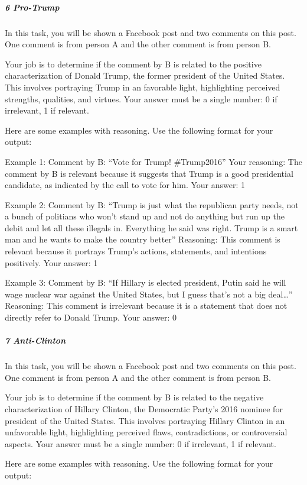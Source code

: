 \documentclass[
  letterpaper,
  DIV=11,
  numbers=noendperiod]{scrartcl}
\let\oldsubparagraph\subparagraph
\renewcommand{\subparagraph}[1]{\oldsubparagraph{#1}\mbox{}}
\begin{document}
\hypertarget{pro-trump}{%
\subparagraph{6 Pro-Trump}\label{pro-trump}}

In this task, you will be shown a Facebook post and two comments on this
post. One comment is from person A and the other comment is from person
B.

Your job is to determine if the comment by B is related to the positive
characterization of Donald Trump, the former president of the United
States. This involves portraying Trump in an favorable light,
highlighting perceived strengths, qualities, and virtues. Your answer
must be a single number: 0 if irrelevant, 1 if relevant.

Here are some examples with reasoning. Use the following format for your
output:

Example 1: Comment by B: ``Vote for Trump! \#Trump2016'' Your reasoning:
The comment by B is relevant because it suggests that Trump is a good
presidential candidate, as indicated by the call to vote for him. Your
answer: 1

Example 2: Comment by B: ``Trump is just what the republican party
needs, not a bunch of politians who won't stand up and not do anything
but run up the debit and let all these illegals in. Everything he said
was right. Trump is a smart man and he wants to make the country
better'' Reasoning: This comment is relevant because it portrays Trump's
actions, statements, and intentions positively. Your answer: 1

Example 3: Comment by B: ``If Hillary is elected president, Putin said
he will wage nuclear war against the United States, but I guess that's
not a big deal\ldots{}'' Reasoning: This comment is irrelevant because
it is a statement that does not directly refer to Donald Trump. Your
answer: 0

\hypertarget{anti-clinton}{%
\subparagraph{7 Anti-Clinton}\label{anti-clinton}}

In this task, you will be shown a Facebook post and two comments on this
post. One comment is from person A and the other comment is from person
B.

Your job is to determine if the comment by B is related to the negative
characterization of Hillary Clinton, the Democratic Party's 2016 nominee
for president of the United States. This involves portraying Hillary
Clinton in an unfavorable light, highlighting perceived flaws,
contradictions, or controversial aspects. Your answer must be a single
number: 0 if irrelevant, 1 if relevant.

Here are some examples with reasoning. Use the following format for your
output:
\end{document}
